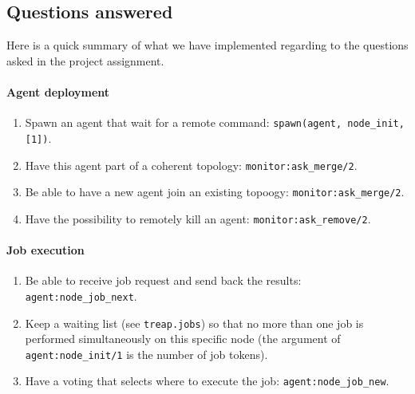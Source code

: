 \documentclass[a4paper, 11pt]{article}
\begin{document}
\newpage

\subsection{Questions answered}

Here is a quick summary of what we have implemented regarding to the questions asked in the project assignment.

\paragraph{Agent deployment}
\begin{enumerate}[label=\alph*)]
	\item Spawn an agent that wait for a remote command: \verb|spawn(agent, node_init, [1])|.
	\item Have this agent part of a coherent topology: \verb|monitor:ask_merge/2|.
	\item Be able to have a new agent join an existing topoogy: \verb|monitor:ask_merge/2|.
	\item Have the possibility to remotely kill an agent: \verb|monitor:ask_remove/2|.
\end{enumerate}

\paragraph{Job execution}

\begin{enumerate}[label=\alph*)]
  \item Be able to receive job request and send back the results: \verb|agent:node_job_next|.
  \item Keep a waiting list (see \verb|treap.jobs|) so that no more than one job is performed simultaneously on this specific node (the argument of \verb|agent:node_init/1| is the number of job tokens).
  \item Have a voting that selects where to execute the job: \verb|agent:node_job_new|.
\end{enumerate}
\end{document}
